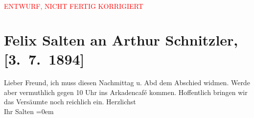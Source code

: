 
\begin{center}
            \textcolor{red}{ENTWURF, NICHT FERTIG KORRIGIERT}
                      \end{center}
            
         \renewcommand{\erwaehnteOrte}{Orte: Café Arkaden, Wien}
         \renewcommand{\erwaehnteWerke}{}
               \section[Felix Salten an Arthur Schnitzler, {[}3. 7. 1894{]}]{ Felix Salten an Arthur Schnitzler, {[}3. 7. 1894{]}}\nopagebreak{}\rehead{ }\begin{ledgroupsized}[t]{13cm}\normalsize\beginnumbering \toendnotes[C]{\smallbreak\pagebreak[2]} 
\pstart
           \noindent{}{\pb}Lieber Freund, ich muss diesen Nachmittag u.
                  Abd dem Abschied widmen. Werde aber vermuthlich gegen 10
                  Uhr ins Arkadencafé kommen. \pend
           \pstart
           Hoffentlich bringen wir das Versäumte noch reichlich ein.\pend
           \pstart
           Herzlichst {\\[\baselineskip]}Ihr \spacefill\mbox{Salten}\pend
           \leftskip=0em{}
         
         \endnumbering{}\end{ledgroupsized}\begin{anhang}\end{anhang}\newcommand{\dateiname}{L03140}\newcommand{\titel}{Felix Salten an Arthur Schnitzler, [3. 7. 1894]}\newcommand{\editorInnen}{Martin Anton Müller und Laura Untner}
      